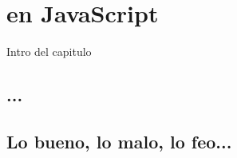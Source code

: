 \chapter{ en JavaScript}

\label{Chapter6}


Intro del capitulo


\section{...}

\section{Lo bueno, lo malo, lo feo...}